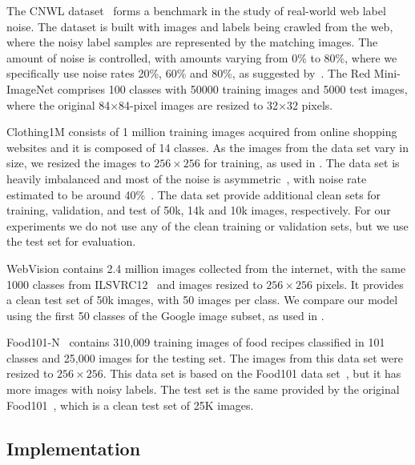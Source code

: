\documentclass[review]{elsarticle}
\begin{document}
 
The CNWL dataset~\cite{jiang2020beyond} forms a benchmark in the study of real-world web label noise. The dataset is built with images and labels being crawled from the web, where the noisy label samples are represented by the matching images. 
The amount of noise is controlled, with amounts varying from 0\% to 80\%, where we specifically use noise rates 20\%, 60\% and 80\%, as suggested by~\cite{FaMUS}. 
The Red Mini-ImageNet comprises 100 classes with 50000 training images and 5000 test images, where the original 84$\times$84-pixel images are resized to 32$\times$32 pixels.

Clothing1M consists of 1 million training images acquired from online shopping websites and it is composed of 14 classes.
As the images from the data set vary in size, we resized the images to $256 \times 256$ for training, as used in \cite{li2020dividemix, han2019deep}.
The data set is heavily imbalanced and most of the noise is asymmetric~\cite{yi2019probabilistic}, with noise rate estimated to be around 40\%~\cite{xiao2015learning}. The data set provide additional clean sets for 
training, validation, and test of 50k, 14k and 10k images, respectively. For our experiments we do not use any of the clean training or validation sets, but we use the test set for evaluation.

WebVision contains 2.4 million images collected from the internet, with the same 1000 classes from ILSVRC12~\cite{deng2009imagenet} and images resized  to $256 \times 256$ pixels. It provides a clean test set of 50k images, with 50 images per class. We compare our model using the first 50 classes of the Google image subset, as used in \cite{li2020dividemix, chen2019understanding}.


Food101-N~\cite{lee2018cleannet} contains 310,009 training images of food recipes classified in 101 classes and 25,000 images for the testing set. The images from this data set were resized to $256 \times 256$. 
This data set is based on the Food101 data set~\cite{bossard2014food}, but it has more images with noisy labels. 
The test set is the same provided by the original Food101~\cite{bossard2014food}, which is a clean test set of 25K images.



\subsection{Implementation}
\end{document}
